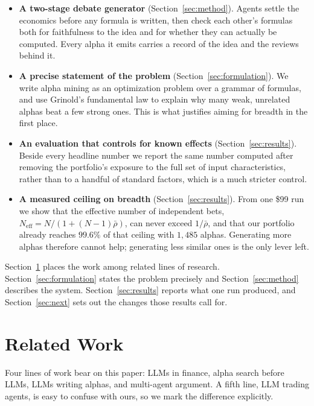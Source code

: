 \documentclass{article}
\theoremstyle{definition}
\theoremstyle{plain}
\theoremstyle{remark}
\begin{document}
\begin{itemize}[leftmargin=1.4em,itemsep=1pt,topsep=2pt]
  \item \textbf{A two-stage debate generator} (Section~\ref{sec:method}). Agents settle
  the economics before any formula is written, then check each other's formulas both for
  faithfulness to the idea and for whether they can actually be computed. Every alpha it
  emits carries a record of the idea and the reviews behind it.
  \item \textbf{A precise statement of the problem} (Section~\ref{sec:formulation}). We
  write alpha mining as an optimization problem over a grammar of formulas, and use
  Grinold's fundamental law to explain why many weak, unrelated alphas beat a few strong
  ones. This is what justifies aiming for breadth in the first place.
  \item \textbf{An evaluation that controls for known effects} (Section~\ref{sec:results}).
  Beside every headline number we report the same number computed after removing the
  portfolio's exposure to the full set of input characteristics, rather than to a handful
  of standard factors, which is a much stricter control.
  \item \textbf{A measured ceiling on breadth} (Section~\ref{sec:results}). From one
  \$99 run we show that the effective number of independent bets,
  $N_{\mathrm{eff}}=N/(1+(N-1)\bar\rho)$, can never exceed $1/\bar\rho$, and that our
  portfolio already reaches $99.6\%$ of that ceiling with $1{,}485$ alphas. Generating
  more alphas therefore cannot help; generating less similar ones is the only lever left.
\end{itemize}
Section~\ref{sec:related} places the work among related lines of research.
Section~\ref{sec:formulation} states the problem precisely and Section~\ref{sec:method}
describes the system. Section~\ref{sec:results} reports what one run produced, and
Section~\ref{sec:next} sets out the changes those results call for.

\section{Related Work}
\label{sec:related}

Four lines of work bear on this paper: LLMs in finance, alpha search before LLMs, LLMs
writing alphas, and multi-agent argument. A fifth line, LLM trading agents, is easy to
confuse with ours, so we mark the difference explicitly.
\end{document}
